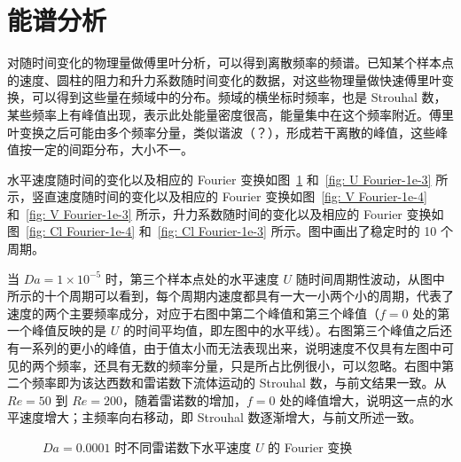 \section{能谱分析} %

对随时间变化的物理量做傅里叶分析，可以得到离散频率的频谱。已知某个样本点的速度、圆柱的阻力和升力系数随时间变化的数据，对这些物理量做快速傅里叶变换，可以得到这些量在频域中的分布。频域的横坐标时频率，也是 Strouhal 数，某些频率上有峰值出现，表示此处能量密度很高，能量集中在这个频率附近。傅里叶变换之后可能由多个频率分量，类似谐波（？），形成若干离散的峰值，这些峰值按一定的间距分布，大小不一。

水平速度随时间的变化以及相应的 Fourier 变换如图~\ref{fig: U Fourier-1e-4} 和~\ref{fig: U Fourier-1e-3} 所示，竖直速度随时间的变化以及相应的 Fourier 变换如图~\ref{fig: V Fourier-1e-4} 和~\ref{fig: V Fourier-1e-3} 所示，升力系数随时间的变化以及相应的 Fourier 变换如图~\ref{fig: Cl Fourier-1e-4} 和~\ref{fig: Cl Fourier-1e-3} 所示。图中画出了稳定时的 10 个周期。

当 $Da=1\times 10^{-5}$ 时，第三个样本点处的水平速度 $U$ 随时间周期性波动，从图中所示的十个周期可以看到，每个周期内速度都具有一大一小两个小的周期，代表了速度的两个主要频率成分，对应于右图中第二个峰值和第三个峰值（$f=0$ 处的第一个峰值反映的是 $U$ 的时间平均值，即左图中的水平线）。右图第三个峰值之后还有一系列的更小的峰值，由于值太小而无法表现出来，说明速度不仅具有左图中可见的两个频率，还具有无数的频率分量，只是所占比例很小，可以忽略。右图中第二个频率即为该达西数和雷诺数下流体运动的 Strouhal 数，与前文结果一致。从 $Re=50$ 到 $Re=200$，随着雷诺数的增加，$f=0$ 处的峰值增大，说明这一点的水平速度增大；主频率向右移动，即 Strouhal 数逐渐增大，与前文所述一致。

\begin{figure}
	\centering
	\begin{minipage}{\textwidth}
		\centering
	\end{minipage}
	\centering
	\begin{minipage}{\textwidth}
		\centering
	\end{minipage}
	\centering
	\begin{minipage}{\textwidth}
		\centering
	\end{minipage}
	\centering
	\begin{minipage}{\textwidth}
		\centering
	\end{minipage}
	\caption{$Da=0.0001$ 时不同雷诺数下水平速度 $U$ 的 Fourier 变换}
	\label{fig: U Fourier-1e-4}
\end{figure}

